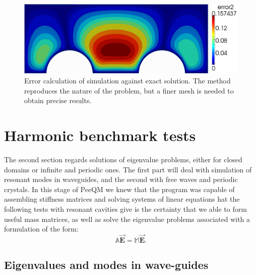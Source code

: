 \begin{figure}
\centering
\includegraphics[scale=0.4]{./img/two_cylinders_error.pdf}
\caption{Error calculation of simulation against exact solution. The method reproduces the nature of the problem, but a finer mesh is needed to obtain precise results.}
\label{fig:two_cylinders_error}
\end{figure}

\section{Harmonic benchmark tests}
The second section regards solutions of eigenvalue problems, either for closed domains or infinite and periodic ones. The first part will deal with simulation of resonant modes in waveguides, and the second with free waves and periodic crystals.
In this stage of PeeQM we knew that the program was capable of assembling stiffness matrices and solving systems of linear equations hat the following tests with resonant cavities give is the certainty that we  able to form useful mass matrices, as well as solve the eigenvalue problems associated with a formulation of the form:
\[\mathbb{A}\mathbf{\vec{E}} = \mathbb{M}\mathbf{\vec{E}}.\]

\subsection{Eigenvalues and modes in wave-guides}

